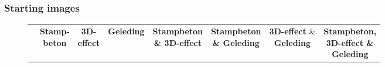 \subsubsection{Starting images}
\begin{figure}[H]
  \centering
  {\footnotesize
  \renewcommand{\arraystretch}{1.1}
  \setlength{\tabcolsep}{4pt}
  \begin{tabular}{c c c c c c c c}
    & \shortstack{\textbf{Stamp-}\\\textbf{beton}} 
    & \shortstack{\textbf{3D-}\\\textbf{effect}} 
    & \textbf{Geleding} 
    & \shortstack{\textbf{Stampbeton}\\ \textbf{\& 3D-effect}} 
    & \shortstack{\textbf{Stampbeton}\\ \textbf{\& Geleding}} 
    & \shortstack{\textbf{3D-effect} \&\\ \textbf{Geleding}} 
    & \shortstack{\textbf{Stampbeton,}\\\textbf{3D-effect \&}\\\textbf{Geleding}} \\


\end{tabular}}
\end{figure}
